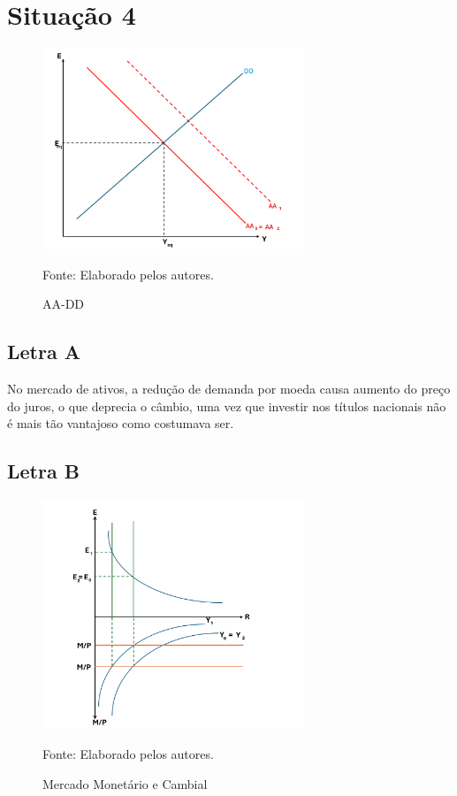 \documentclass[a4paper,12pt]{article}[abntex2]
\begin{document}
\section{\textbf{Situação 4}}
\begin{figure}[H]
    \centering
    \caption{AA-DD} 
    \includegraphics[width=0.7\textwidth]{4º Período/Macroeconomia Internacional/APS 4 Macro Int/AA-DD L(d).png}
    \label{fig:AADD L}
    
    \footnotesize{Fonte: Elaborado pelos autores.}
    \end{figure}

\subsection{\textbf{Letra A}}

No mercado de ativos, a redução de demanda por moeda causa aumento do preço do juros, o que deprecia o câmbio, uma vez que investir nos títulos nacionais não é mais tão vantajoso como costumava ser.

\subsection{\textbf{Letra B}}

\begin{figure}[H]
    \centering
    \caption{Mercado Monetário e Cambial} 
    \includegraphics[width=0.7\textwidth]{4º Período/Macroeconomia Internacional/APS 4 Macro Int/Merc. Mont L(d).png}
    \label{fig:Moeda L}
    
    \footnotesize{Fonte: Elaborado pelos autores.}
    \end{figure}
\end{document}
